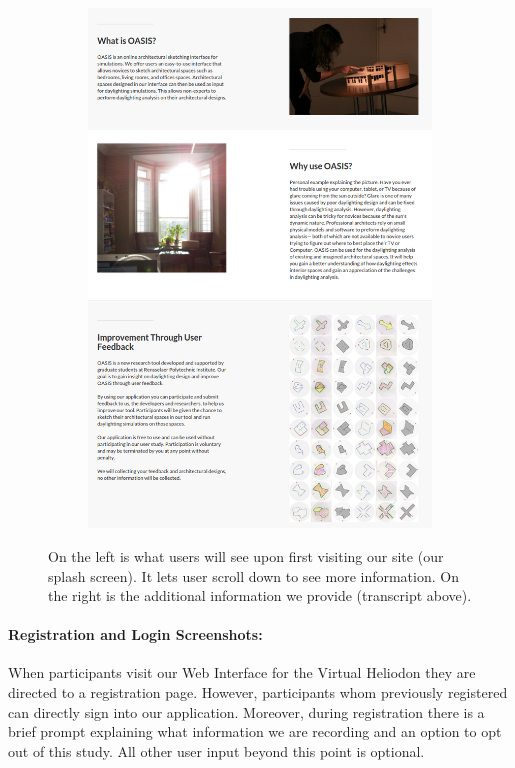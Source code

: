 \documentclass[12pt]{article}
\begin{document}
\begin{figure}[h]
\begin{subfigure}{.5\textwidth}
    \includegraphics[scale=0.3]{big_img}
  \end{subfigure}

\caption{On the left is what users will see upon first visiting our site (our splash screen). It lets user scroll down to see more information.  On the right is the additional information we provide (transcript above).}  
\label{fig:splash}
\end{figure}
\newpage


\paragraph{Registration and Login Screenshots:}
When participants visit our Web Interface for the Virtual Heliodon they are directed to a registration page. 
However, participants whom previously registered can directly sign into our application. Moreover, during registration there is a brief prompt explaining what information we are recording and an option to opt out of this study.  All other user input beyond this point is optional.\\
\end{document}
